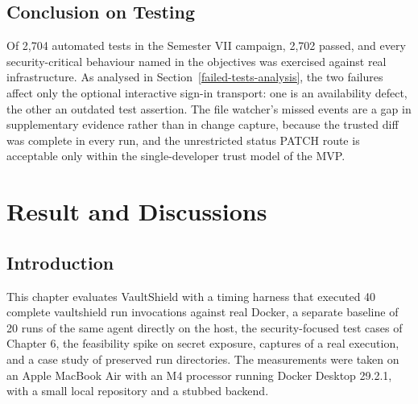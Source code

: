 \documentclass[12pt,a4paper,oneside]{report}
\begin{document}
\endgroup

\section{Conclusion on Testing}\label{conclusion-on-testing}

Of 2,704 automated tests in the Semester VII campaign, 2,702 passed, and every security-critical behaviour named in the objectives was exercised against real infrastructure. As analysed in Section~\ref{failed-tests-analysis}, the two failures affect only the optional interactive sign-in transport: one is an availability defect, the other an outdated test assertion. The file watcher's missed events are a gap in supplementary evidence rather than in change capture, because the trusted diff was complete in every run, and the unrestricted status PATCH route is acceptable only within the single-developer trust model of the MVP.

\clearpage

\chapter{Result and Discussions}\label{results-and-analysis}

\section{Introduction}\label{introduction-1}

This chapter evaluates VaultShield with a timing harness that executed 40 complete vaultshield run invocations against real Docker, a separate baseline of 20 runs of the same agent directly on the host, the security-focused test cases of Chapter 6, the feasibility spike on secret exposure, captures of a real execution, and a case study of preserved run directories. The measurements were taken on an Apple MacBook Air with an M4 processor running Docker Desktop 29.2.1, with a small local repository and a stubbed backend.

\medskip\noindent{}
\medskip
\end{document}
